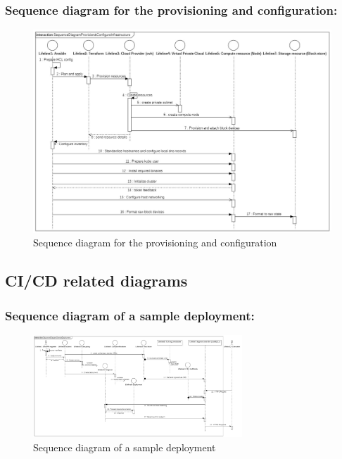\subsubsection{Sequence diagram for the provisioning and configuration:}
\begin{figure}[H]\centering
\includegraphics[width=1\textwidth,angle=90,keepaspectratio]{assets/f3.jpg}
\caption{Sequence diagram for the provisioning and configuration}
\end{figure}


\subsection{CI/CD related diagrams}

\subsubsection{Sequence diagram of a sample deployment: }
\begin{figure}[H]\centering
\includegraphics[width=0.7\textwidth,angle=00]{assets/f4.jpg}
\caption{Sequence diagram of a sample deployment}
\label{fig:f4}
\end{figure}
